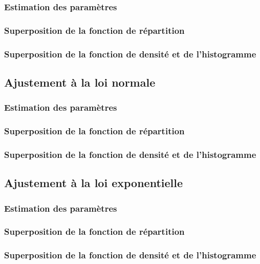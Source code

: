 \documentclass{article}
\begin{document}
\subsubsection{Estimation des paramètres}
\subsubsection{Superposition de la fonction de répartition}
\subsubsection{Superposition de la fonction de densité et de l'histogramme}

\subsection{Ajustement à la loi normale}

\subsubsection{Estimation des paramètres}
\subsubsection{Superposition de la fonction de répartition}
\subsubsection{Superposition de la fonction de densité et de l'histogramme}

\subsection {Ajustement à la loi exponentielle}

\subsubsection{Estimation des paramètres}
\subsubsection{Superposition de la fonction de répartition}
\subsubsection{Superposition de la fonction de densité et de l'histogramme}

\newpage
\appendix
\end{document}
